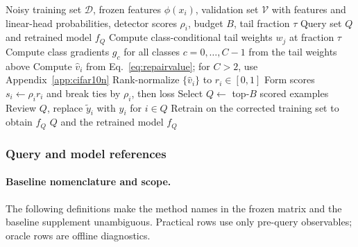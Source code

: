 \documentclass{article}
\begin{document}
\begin{algorithm}[H]
\caption{RV-Q as a preliminary value-alignment baseline}
\label{alg:repairvalue-appendix}
\begin{algorithmic}[1]
\Require Noisy training set $\mathcal D$, frozen features $\phi(x_i)$, validation set $\mathcal V$ with features and linear-head probabilities, detector scores $\rho_i$, budget $B$, tail fraction $\tau$
\Ensure Query set $Q$ and retrained model $f_Q$
\State Compute class-conditional tail weights $w_j$ at fraction $\tau$
\State Compute class gradients $g_c$ for all classes $c=0,\ldots,C-1$ from the tail weights above
\State Compute $\hat v_i$ from Eq.~\ref{eq:repairvalue}; for $C>2$, use Appendix~\ref{app:cifar10n}
\State Rank-normalize $\{\hat v_i\}$ to $r_i\in[0,1]$
\State Form scores $s_i\leftarrow \rho_i r_i$ and break ties by $\rho_i$, then loss
\State Select $Q\leftarrow$ top-$B$ scored examples
\State Review $Q$, replace $\tilde y_i$ with $y_i$ for $i\in Q$
\State Retrain on the corrected training set to obtain $f_Q$
\State \Return $Q$ and the retrained model $f_Q$
\end{algorithmic}
\end{algorithm}

\subsubsection{Query and model references}

\paragraph{Baseline nomenclature and scope.}
The following definitions make the method names in the frozen matrix and the
baseline supplement unambiguous. Practical rows use only pre-query observables;
oracle rows are offline diagnostics.
\end{document}
